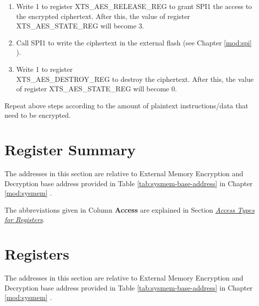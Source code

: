 \documentclass[main\_\_EN.tex]{subfiles}
\begin{document}
\begin{enumerate}
    \item Write 1 to register XTS\_AES\_RELEASE\_REG to grant SPI1 the access to the encrypted ciphertext. After this, the value of register XTS\_AES\_STATE\_REG will become 3. 
    
    \item Call SPI1 to write the ciphertext in the external flash (see Chapter \ref{mod:spi} \textit{}).
    
    \item Write 1 to register\\ XTS\_AES\_DESTROY\_REG to destroy the ciphertext. After this, the value of register XTS\_AES\_STATE\_REG will become 0.
    
\end{enumerate}

Repeat above steps according to the amount of plaintext instructions/data that need to be encrypted.




\clearpage
\section{Register Summary}
\label{sec:extmemencr-reg-summ}
\hypertarget{extmemencr-reg-summ}{}

The addresses in this section are relative to External Memory Encryption and Decryption base address provided in Table \ref{tab:sysmem-base-address} in Chapter \ref{mod:sysmem} \textit{}.

The abbreviations given in Column \textbf{Access} are explained in Section \hyperref[glossary-access-types]{\textit{Access Types for Registers}}.





\clearpage
\section{Registers}

The addresses in this section are relative to External Memory Encryption and Decryption base address provided in Table \ref{tab:sysmem-base-address} in Chapter \ref{mod:sysmem} \textit{}.


\end{document}

